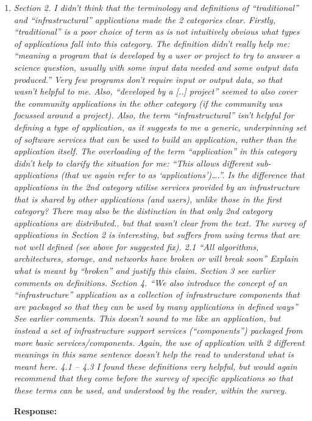 \documentclass{article}
\begin{document}
\begin{enumerate}
\item \emph{Section 2. I didn’t think that the terminology and definitions of “traditional” and “infrastructural” applications made the 2 categories clear. Firstly, “traditional” is a poor choice of term as is not intuitively obvious what types of applications fall into this category. The definition didn’t really help me: “meaning a program that is developed by a user or project to try to answer a science question, usually with some input data needed and some output data produced.” Very few programs don’t require input or output data, so that wasn’t helpful to me. Also, “developed by a [..] project” seemed to also cover the community applications in the other category (if the community was focussed around a project). Also, the term “infrastructural” isn’t helpful for defining a type of application, as it suggests to me a generic, underpinning set of software services that can be used to build an application, rather than the application itself. The overloading of the term “application” in this category didn’t help to clarify the situation for me: “This allows different sub-applications (that we again refer to as ‘applications’)….”. Is the difference that applications in the 2nd category utilise services provided by an infrastructure that is shared by other applications (and users), unlike those in the first category? There may also be the distinction in that only 2nd category applications are distributed.. but that wasn’t clear from the text. The survey of applications in Section 2 is interesting, but suffers from using terms that are not well defined (see above for suggested fix). 2.1 “All algorithms, architectures, storage, and networks have broken or will break soon” Explain what is meant by “broken” and justify this claim. Section 3 see earlier comments on definitions. Section 4. “We also introduce the concept of an “infrastructure” application as a collection of infrastructure components that are packaged so that they can be used by many applications in deﬁned ways” See earlier comments. This doesn’t sound to me like an application, but instead a set of infrastructure support services (“components”) packaged from more basic services/components. Again, the use of application with 2 different meanings in this same sentence doesn’t help the read to understand what is meant here. 4.1 – 4.3 I found these definitions very helpful, but would again recommend that they come before the survey of specific applications so that these terms can be used, and understood by the reader, within the survey.}

\textbf{Response:} 

\end{enumerate}

\end{document}
